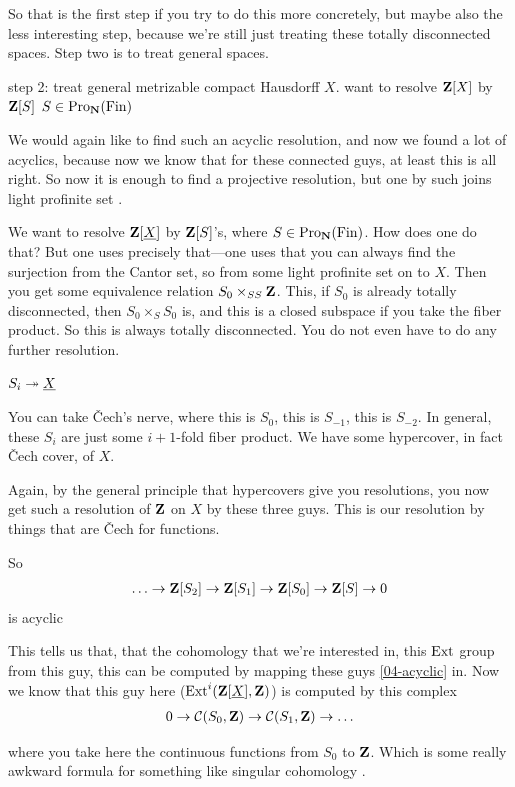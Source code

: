 %
So that is the first step if you try to do this more concretely, but maybe also the less interesting step, because we're still just treating these totally disconnected spaces. 
%
Step two is to treat general spaces.

%
step 2: treat general metrizable compact Hausdorff $X$.
want to resolve $\mathbf Z[X]$ by $\mathbf Z[S]$ $S \in \operatorname{Pro}_\mathbf N (\operatorname{Fin})$

%
We would again like to find such an acyclic resolution, and now we found a lot of acyclics, because now we know that for these connected guys, at least this is all right. So now it is enough to find a projective resolution, but one by such joins light profinite set .

We want to resolve $\mathbf Z[\underline{X}]$ by $\mathbf Z[S]$'s, where $S \in \operatorname{Pro}_\mathbf N (\operatorname{Fin})$. How does one do that? But one uses precisely that---one uses that you can always find the surjection from the Cantor set, so from some light profinite set on to $X$. Then you get some equivalence relation $S_0 \times_{SS} \mathbf Z$. 
This, if $S_0$ is already totally disconnected, then $S_0 \times_S S_0$ is, and this is a closed subspace if you take the fiber product. So this is always totally disconnected. You do not even have to do any further resolution.

$ S_i \twoheadrightarrow \underline{X}$

%
You can take Čech's nerve, where this is $S_0$, this is $S_{-1}$, this is $S_{-2}$. In general, these $S_i$ are just some $i+1$-fold fiber product. We have some hypercover, in fact Čech cover, of $X$.

%
Again, by the general principle that hypercovers give you resolutions, you now get such a resolution of $\mathbf Z$ on $X$ by these three guys. This is our resolution by things that are Čech for functions.

So
\begin{align*} \label{04-acyclic}
	\ldots \to \mathbf Z[S_2] \to \mathbf Z[S_1] \to \mathbf Z[S_0] \to \mathbf Z[S] \to 0
\end{align*}
is acyclic

This tells us that, that the cohomology that we're interested in, this $\operatorname{Ext}$ group from this guy, this can be computed by mapping these guys \ref{04-acyclic} in. 
Now we know that this guy here ($\operatorname{Ext}^i(\mathbf Z[\underline{X}], \mathbf Z)$) is computed by this complex 
\begin{align*} \label{04-cont}
	0 \to \mathcal{C}(S_0,\mathbf Z) \to \mathcal{C}(S_1,\mathbf Z) \to \ldots
\end{align*}

where you take here the continuous functions from $S_0$ to $\mathbf Z$. 
Which is some really awkward formula for something like singular cohomology .

